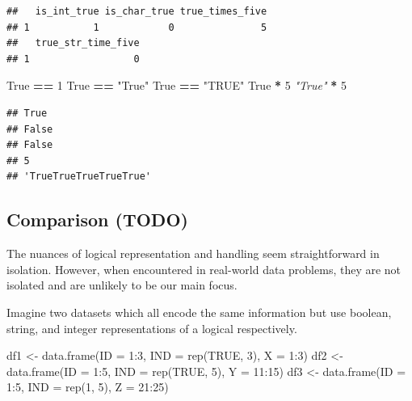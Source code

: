 \documentclass[
]{krantz}
\makeatletter
\newenvironment{Shaded}{\begin{snugshade}}{\end{snugshade}}
\newcommand{\AttributeTok}[1]{\textcolor[rgb]{0.61,0.61,0.61}{#1}}
\newcommand{\CommentTok}[1]{\textcolor[rgb]{0.37,0.37,0.37}{\textit{#1}}}
\newcommand{\ConstantTok}[1]{\textcolor[rgb]{0,0,0}{#1}}
\newcommand{\DecValTok}[1]{\textcolor[rgb]{0.06,0.06,0.06}{#1}}
\newcommand{\FunctionTok}[1]{\textcolor[rgb]{0,0,0}{#1}}
\newcommand{\NormalTok}[1]{#1}
\newcommand{\OperatorTok}[1]{\textcolor[rgb]{0.43,0.43,0.43}{\textbf{#1}}}
\newcommand{\OtherTok}[1]{\textcolor[rgb]{0.37,0.37,0.37}{#1}}
\newcommand{\SpecialCharTok}[1]{\textcolor[rgb]{0,0,0}{#1}}
\newcommand{\StringTok}[1]{\textcolor[rgb]{0.5,0.5,0.5}{#1}}
\newcommand{\VariableTok}[1]{\textcolor[rgb]{0,0,0}{#1}}
\newenvironment{kframe}{%
\medskip{}
\setlength{\fboxsep}{.8em}
 \def\at@end@of@kframe{}%
 \ifinner\ifhmode%
  \def\at@end@of@kframe{\end{minipage}}%
  \begin{minipage}{\columnwidth}%
 \fi\fi%
 \def\FrameCommand##1{\hskip\@totalleftmargin \hskip-\fboxsep
 \colorbox{shadecolor}{##1}\hskip-\fboxsep
     \hskip-\linewidth \hskip-\@totalleftmargin \hskip\columnwidth}%
 \MakeFramed {\advance\hsize-\width
   \@totalleftmargin\z@ \linewidth\hsize
   \@setminipage}}%
 {\par\unskip\endMakeFramed%
 \at@end@of@kframe}
\renewenvironment{Shaded}{\begin{kframe}}{\end{kframe}}
\makeatother
\begin{document}
\begin{verbatim}
##   is_int_true is_char_true true_times_five
## 1           1            0               5
##   true_str_time_five
## 1                  0
\end{verbatim}

\begin{Shaded}
\begin{Highlighting}[]
\VariableTok{True} \OperatorTok{==} \DecValTok{1}
\VariableTok{True} \OperatorTok{==} \StringTok{"True"}
\VariableTok{True} \OperatorTok{==} \StringTok{"TRUE"}
\VariableTok{True} \OperatorTok{*} \DecValTok{5}
\CommentTok{"True"} \OperatorTok{*} \DecValTok{5}
\end{Highlighting}
\end{Shaded}

\begin{verbatim}
## True
## False
## False
## 5
## 'TrueTrueTrueTrueTrue'
\end{verbatim}

\hypertarget{comparison-todo}{%
\subsection{Comparison (TODO)}\label{comparison-todo}}

The nuances of logical representation and handling seem straightforward in isolation.
However, when encountered in real-world data problems, they are not isolated and are unlikely to be our main focus.

Imagine two datasets which all encode the same information but use boolean, string, and integer representations of a logical respectively.

\begin{Shaded}
\begin{Highlighting}[]
\NormalTok{df1 }\OtherTok{\textless{}{-}} \FunctionTok{data.frame}\NormalTok{(}\AttributeTok{ID =} \DecValTok{1}\SpecialCharTok{:}\DecValTok{3}\NormalTok{, }\AttributeTok{IND =} \FunctionTok{rep}\NormalTok{(}\ConstantTok{TRUE}\NormalTok{, }\DecValTok{3}\NormalTok{), }\AttributeTok{X =} \DecValTok{1}\SpecialCharTok{:}\DecValTok{3}\NormalTok{)}
\NormalTok{df2 }\OtherTok{\textless{}{-}} \FunctionTok{data.frame}\NormalTok{(}\AttributeTok{ID =} \DecValTok{1}\SpecialCharTok{:}\DecValTok{5}\NormalTok{, }\AttributeTok{IND =} \FunctionTok{rep}\NormalTok{(}\StringTok{\textquotesingle{}TRUE\textquotesingle{}}\NormalTok{, }\DecValTok{5}\NormalTok{), }\AttributeTok{Y =} \DecValTok{11}\SpecialCharTok{:}\DecValTok{15}\NormalTok{)}
\NormalTok{df3 }\OtherTok{\textless{}{-}} \FunctionTok{data.frame}\NormalTok{(}\AttributeTok{ID =} \DecValTok{1}\SpecialCharTok{:}\DecValTok{5}\NormalTok{, }\AttributeTok{IND =} \FunctionTok{rep}\NormalTok{(}\DecValTok{1}\NormalTok{, }\DecValTok{5}\NormalTok{), }\AttributeTok{Z =} \DecValTok{21}\SpecialCharTok{:}\DecValTok{25}\NormalTok{)}
\end{Highlighting}
\end{Shaded}
\end{document}
